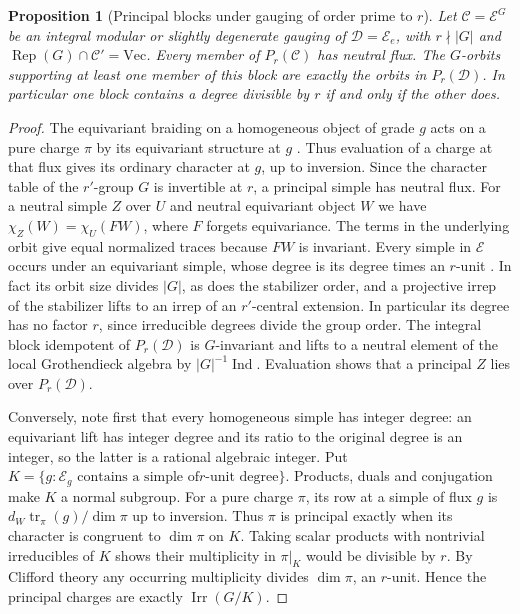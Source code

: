 \documentclass[11pt,a4paper]{article}
\numberwithin{equation}{section}
\newtheorem{proposition}[theorem]{Proposition}
\theoremstyle{remark}
\begin{document}
\begin{proposition}[Principal blocks under gauging of order prime to $r$]
\label{prop:gauging-principal-descent}
Let $\mathcal C=\mathcal E^G$ be an integral modular or slightly
degenerate gauging of $\mathcal D=\mathcal E_e$, with $r\nmid |G|$
and $\operatorname{Rep}(G)\cap\mathcal C'=\mathrm{Vec}$.
Every member of $P_r(\mathcal C)$ has neutral flux. The $G$-orbits
supporting at least one member of this block are exactly the orbits in
$P_r(\mathcal D)$. In particular one block contains a degree divisible
by $r$ if and only if the other does.
\end{proposition}
\begin{proof}
The equivariant braiding on a homogeneous object of grade $g$ acts on
a pure charge $\pi$ by its equivariant structure at $g$
\cite[Section~4.4.4 and proof of Proposition~4.56(i)]{DGNO}. Thus evaluation of a charge at that flux
gives its ordinary character at $g$, up to inversion. Since the character table of the $r'$-group
$G$ is invertible at $r$, a principal simple has neutral flux.
For a neutral simple $Z$ over $U$ and neutral equivariant object $W$
we have $\chi_Z(W)=\chi_U(FW)$, where $F$ forgets equivariance.
The terms in the underlying orbit give equal normalized traces
because $FW$ is invariant. Every simple in $\mathcal E$ occurs under
an equivariant simple, whose degree is its degree times an $r$-unit
\cite[Corollary~2.13]{BNEquiv}. In fact its orbit
size divides $|G|$, as does the stabilizer order, and a projective
irrep of the stabilizer lifts to an irrep of an $r'$-central extension.
In particular its degree has no factor $r$, since irreducible degrees
divide the group order. The integral block idempotent of
$P_r(\mathcal D)$ is $G$-invariant and lifts to a neutral element
of the local Grothendieck algebra by $|G|^{-1}\operatorname{Ind}$. Evaluation shows
that a principal $Z$ lies over $P_r(\mathcal D)$.

Conversely, note first that every homogeneous simple has integer degree: an equivariant lift has integer degree and its ratio to the original degree is an integer, so the latter is a rational algebraic integer. Put $K=\{g:\mathcal E_g\text{ contains a simple of
$r$-unit degree}\}$. Products, duals and conjugation make $K$
a normal subgroup. For a pure charge $\pi$, its row at a simple of
flux $g$ is $d_W\operatorname{tr}_\pi(g)/\dim\pi$ up to inversion.
Thus $\pi$ is principal exactly when its character is congruent to
$\dim\pi$ on $K$. Taking scalar products with nontrivial irreducibles
of $K$ shows their multiplicity in $\pi|_K$ would be divisible by
$r$. By Clifford theory any occurring multiplicity divides $\dim\pi$,
an $r$-unit. Hence the principal charges are exactly
$\operatorname{Irr}(G/K)$.


\end{proof}
\end{document}
